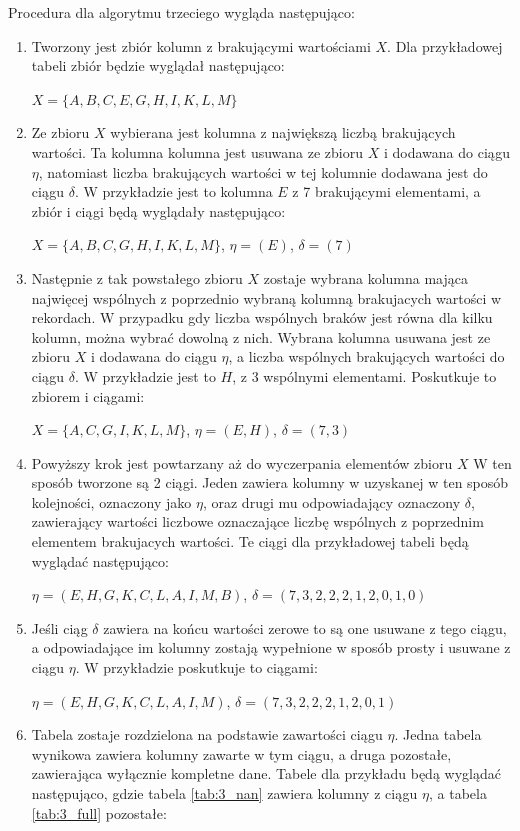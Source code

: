 \documentclass[12pt,twoside]{article}
\begin{document}
Procedura dla algorytmu trzeciego wygląda następująco:

\begin{enumerate}[label=\arabic*), leftmargin=1.25cm]
    \item Tworzony jest zbiór kolumn z brakującymi wartościami $X$.
          Dla przykładowej tabeli zbiór będzie wyglądał następująco:

          $X=\{A,B,C,E,G,H,I,K,L,M\}$
    \item Ze zbioru $X$ wybierana jest kolumna z największą liczbą brakujących wartości.
          Ta kolumna kolumna jest usuwana ze zbioru $X$ i dodawana do ciągu $\eta$,
          natomiast liczba brakujących wartości w tej kolumnie dodawana jest do ciągu $\delta$.
          W przykładzie jest to kolumna $E$ z 7 brakującymi elementami, a zbiór i ciągi będą wyglądały następująco:

          $X=\{A,B,C,G,H,I,K,L,M\}$, $\eta=(E)$, $\delta=(7)$
    \item Następnie z tak powstałego zbioru $X$ zostaje wybrana kolumna mająca najwięcej wspólnych z poprzednio wybraną
          kolumną brakujacych wartości w rekordach.
          W przypadku gdy liczba wspólnych braków jest równa dla kilku kolumn, można wybrać dowolną z nich.
          Wybrana kolumna usuwana jest ze zbioru $X$ i dodawana do ciągu $\eta$,
          a liczba wspólnych brakujących wartości do ciągu $\delta$.
          W przykładzie jest to $H$, z 3 wspólnymi elementami. Poskutkuje to zbiorem i ciągami:

          $X=\{A,C,G,I,K,L,M\}$, $\eta=(E,H)$, $\delta=(7,3)$
    \item Powyższy krok jest powtarzany aż do wyczerpania elementów zbioru $X$
          W ten sposób tworzone są 2 ciągi. Jeden zawiera kolumny w uzyskanej w ten sposób kolejności, oznaczony jako $\eta$,
          oraz drugi mu odpowiadający oznaczony $\delta$,
          zawierający wartości liczbowe oznaczające liczbę wspólnych z poprzednim elementem brakujacych wartości.
          Te ciągi dla przykładowej tabeli będą wyglądać następująco:

          $\eta=(E,H,G,K,C,L,A,I,M,B)$, $\delta=(7,3,2,2,2,1,2,0,1,0)$
    \item Jeśli ciąg $\delta$ zawiera na końcu wartości zerowe to są one usuwane z tego ciągu,
          a odpowiadające im kolumny zostają wypełnione w sposób prosty i usuwane z ciągu $\eta$.
          W przykładzie poskutkuje to ciągami:

          $\eta=(E,H,G,K,C,L,A,I,M)$, $\delta=(7,3,2,2,2,1,2,0,1)$
    \item Tabela zostaje rozdzielona na podstawie zawartości ciągu $\eta$.
          Jedna tabela wynikowa zawiera kolumny zawarte w tym ciągu, a druga pozostałe, zawierająca wyłącznie kompletne dane.
          Tabele dla przykładu będą wyglądać następująco, gdzie tabela \ref{tab:3_nan} zawiera kolumny z ciągu $\eta$, a tabela \ref{tab:3_full} pozostałe:


\end{enumerate}
\end{document}
